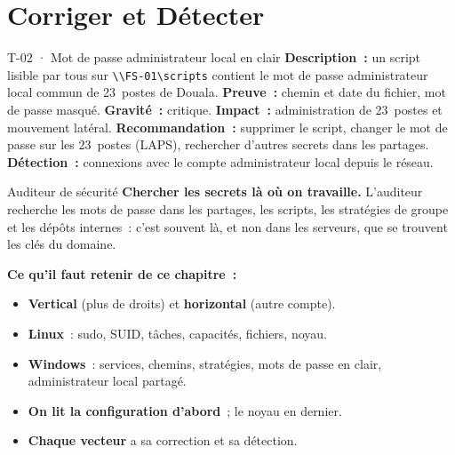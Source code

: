 \section{Corriger et Détecter}
\label{sec:c11-corriger}

\begin{boxobjet}{T-02 · Mot de passe administrateur local en clair}
\textbf{Description~:} un script lisible par tous sur
\texttt{\textbackslash\textbackslash FS-01\textbackslash scripts} contient le
mot de passe administrateur local commun de 23~postes de Douala.
\textbf{Preuve~:} chemin et date du fichier, mot de passe masqué.
\textbf{Gravité~:} critique. \textbf{Impact~:} administration de 23~postes
et mouvement latéral. \textbf{Recommandation~:} supprimer le script,
changer le mot de passe sur les 23~postes (LAPS), rechercher d'autres
secrets dans les partages. \textbf{Détection~:} connexions avec le compte
administrateur local depuis le réseau.
\end{boxobjet}

\begin{boxmetier}{Auditeur de sécurité}
\textbf{Chercher les secrets là où on travaille.} L'auditeur recherche les
mots de passe dans les partages, les scripts, les stratégies de groupe et
les dépôts internes~: c'est souvent là, et non dans les serveurs, que se
trouvent les clés du domaine.
\end{boxmetier}

\separateur

\begin{boxresume}
\textbf{Ce qu'il faut retenir de ce chapitre~:}
\begin{itemize}
    \item \textbf{Vertical} (plus de droits) et \textbf{horizontal} (autre
          compte).
    \item \textbf{Linux}~: sudo, SUID, tâches, capacités, fichiers, noyau.
    \item \textbf{Windows}~: services, chemins, stratégies, mots de passe en
          clair, administrateur local partagé.
    \item \textbf{On lit la configuration d'abord}~; le noyau en dernier.
    \item \textbf{Chaque vecteur} a sa correction et sa détection.
\end{itemize}
\end{boxresume}

